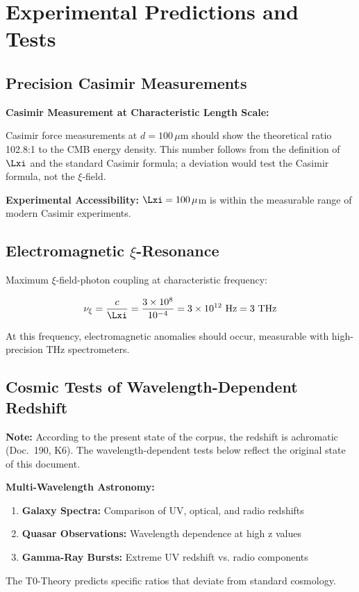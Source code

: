 	\section{Experimental Predictions and Tests}
	
	\subsection{Precision Casimir Measurements}
	
	\begin{experiment}
		\textbf{Casimir Measurement at Characteristic Length Scale:}
		
		Casimir force measurements at $d = 100\,\mu$m should show the theoretical ratio 102.8:1 to the CMB energy density. This number follows from the definition of $\Lxi$ and the standard Casimir formula; a deviation would test the Casimir formula, not the $\xi$-field.
		
		\textbf{Experimental Accessibility:} $\Lxi = 100\,\mu$m is within the measurable range of modern Casimir experiments.
	\end{experiment}
	
	\subsection{Electromagnetic $\xi$-Resonance}
	
	Maximum $\xi$-field-photon coupling at characteristic frequency:
	
	\begin{equation}
		\nu_\xi = \frac{c}{\Lxi} = \frac{3 \times 10^8}{10^{-4}} = 3 \times 10^{12} \text{ Hz} = 3 \text{ THz}
	\end{equation}
	
	At this frequency, electromagnetic anomalies should occur, measurable with high-precision THz spectrometers.
	
	\subsection{Cosmic Tests of Wavelength-Dependent Redshift}
	
	\textbf{Note:} According to the present state of the corpus, the redshift is achromatic (Doc.~190, K6). The wavelength-dependent tests below reflect the original state of this document.
	
	\begin{experiment}
		\textbf{Multi-Wavelength Astronomy:}
		
		\begin{enumerate}
			\item \textbf{Galaxy Spectra:} Comparison of UV, optical, and radio redshifts
			\item \textbf{Quasar Observations:} Wavelength dependence at high z values
			\item \textbf{Gamma-Ray Bursts:} Extreme UV redshift vs. radio components
		\end{enumerate}
		
		The T0-Theory predicts specific ratios that deviate from standard cosmology.
	\end{experiment}
	
